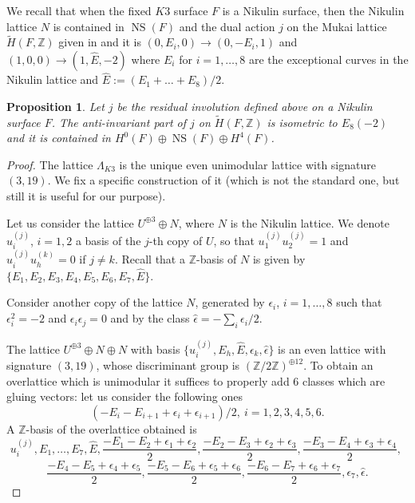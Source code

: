 \documentclass{amsart}
\newtheorem{prop}[thm]{Proposition}
\theoremstyle{definition}
\numberwithin{equation}{section}
\numberwithin{equation}{section} \theoremstyle{definition}
\DeclareMathOperator{\NS}{NS}
\newcommand\ZZ{{\mathbb Z}}
\newcommand\Z{\mathbb{Z}}
\begin{document}
We recall that when the fixed $K3$ surface $F$ is a Nikulin surface, then the Nikulin lattice $N$ is contained in $\NS(F)$  and
the dual action $j$ on the Mukai lattice $\tilde{H}(F,\ZZ)$  given in \cite[Section 7.2]{BO} and it is 
$(0,E_i,0)\to (0,-E_i,1)$ and $(1,0,0)\to (1,\hat{E},-2)$ where $E_i$ for $i=1,\ldots, 8$ are the exceptional curves in the Nikulin lattice and $\hat{E}:=(E_1+\dots +E_8)/2$. 
\begin{prop}\label{61}
 Let $j$ be the residual involution defined above on a Nikulin surface $F$. The anti-invariant part of $j$ on $\tilde{H}(F,\ZZ)$ is isometric to $E_8(-2)$ and it is contained in  $H^0(F)\oplus \NS(F)\oplus H^4(F)$.
\end{prop}
\begin{proof}
The lattice $\Lambda_{K3}$ is the unique even unimodular lattice with signature $(3,19)$. We fix a specific construction of it (which is not the standard one, but still it is useful for our purpose).

Let us consider the lattice $U^{\oplus 3}\oplus N$, where $N$ is the Nikulin lattice. We denote $u_{i}^{(j)}$, $i=1,2$ a basis of the $j$-th copy of $U$, so that $u_1^{(j)}u_2^{(j)}=1$ and $u_i^{(j)}u_h^{(k)}=0$ if $j\neq k$. Recall that 
a $\Z$-basis of $N$ is given by $\{E_1,E_2,E_3,E_4,E_5,E_6, E_7,\hat{E}\}$.

Consider another copy of the lattice $N$, generated by $\epsilon_i$, $i=1,\ldots,8$ such that $\epsilon_i^2=-2$ and $\epsilon_i\epsilon_j=0$ and by the class $\hat{\epsilon}=-\sum_i\epsilon_i/2$.

The lattice $U^{\oplus 3}\oplus N\oplus N$ with basis $\{u_i^{(j)}, E_h,\hat{E},\epsilon_k,\hat{\epsilon}\}$ is an even lattice with signature $(3,19)$, whose discriminant group is $(\Z/2\Z)^{\oplus 12}$.
To obtain an overlattice which is unimodular it suffices to properly add 6 classes which are gluing vectors: let us consider the following ones
$$(-E_i-E_{i+1}+\epsilon_i+\epsilon_{i+1})/2,\ i=1,2,3,4,5,6.$$
A $\Z$-basis of the overlattice obtained is
\begin{equation}\label{eq: basis LambdaK3}u_i^{(j)}, E_1,\ldots , E_7,\hat{E}, \frac{-E_1-E_2+\epsilon_1+\epsilon_2}{2}, \frac{-E_2-E_3+\epsilon_2+\epsilon_3}{2}, \frac{-E_3-E_4+\epsilon_3+\epsilon_4}{2},\ \end{equation} \begin{equation*}\frac{-E_4-E_5+\epsilon_4+\epsilon_5}{2},\frac{-E_5-E_6+\epsilon_5+\epsilon_6}{2},\frac{-E_6-E_7+\epsilon_6+\epsilon_7}{2}, \epsilon_7,\hat{\epsilon}.\end{equation*}


\end{proof}
\end{document}
